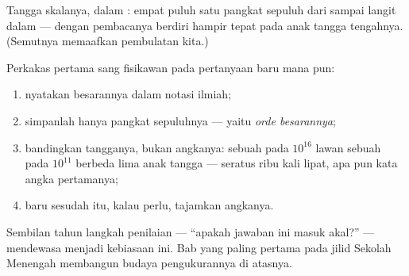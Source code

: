 \begin{omfigure}

{\small Tangga skalanya, dalam : empat puluh satu pangkat sepuluh
dari  sampai langit dalam --- dengan pembacanya berdiri hampir
tepat pada anak tangga tengahnya. (Semutnya memaafkan pembulatan
kita.)}
\end{omfigure}

\begin{method}\label{met:g9:atoms-to-galaxies:oom}
Perkakas pertama sang fisikawan pada pertanyaan baru mana pun:
\begin{enumerate}
  \item nyatakan besarannya dalam notasi ilmiah;
  \item simpanlah hanya pangkat sepuluhnya --- yaitu \emph{orde
        besarannya};
  \item bandingkan tangganya, bukan angkanya: sebuah  pada
        $10^{16}$  lawan sebuah  pada $10^{11}$ berbeda
        lima anak tangga --- seratus ribu kali lipat, apa pun kata
        angka pertamanya;
  \item baru sesudah itu, kalau perlu, tajamkan angkanya.
\end{enumerate}
Sembilan tahun langkah penilaian --- ``apakah jawaban ini masuk
akal?'' --- mendewasa menjadi kebiasaan ini. Bab yang paling pertama
pada jilid Sekolah Menengah membangun budaya pengukurannya di atasnya.
\end{method}

